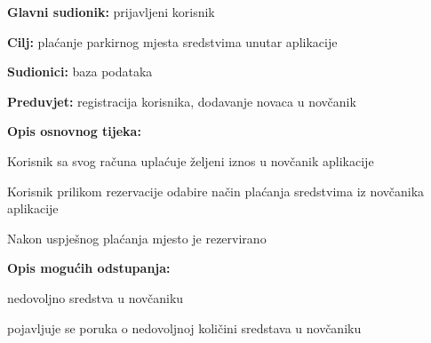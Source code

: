 					\noindent {}
					\begin{packed_item}
						
						\item \textbf{Glavni sudionik: }prijavljeni korisnik
						\item  \textbf{Cilj:} plaćanje parkirnog mjesta sredstvima unutar aplikacije
						\item  \textbf{Sudionici:} baza podataka
						\item  \textbf{Preduvjet:} registracija korisnika, dodavanje novaca u novčanik
						\item  \textbf{Opis osnovnog tijeka:}
						
						\item[] \begin{packed_enum}
							
							\item  Korisnik sa svog računa uplaćuje željeni iznos u novčanik aplikacije
							\item Korisnik prilikom rezervacije odabire način plaćanja sredstvima iz novčanika aplikacije
							\item  Nakon uspješnog plaćanja mjesto je rezervirano
						\end{packed_enum}
						
						\item  \textbf{Opis mogućih odstupanja:}
						
						\item[] \begin{packed_item}
							
							\item[2.a] nedovoljno sredstva u novčaniku
							\item[] \begin{packed_enum}
								
								\item pojavljuje se poruka o nedovoljnoj količini sredstava u novčaniku
								
							\end{packed_enum}

							
						\end{packed_item}
					\end{packed_item}
					

